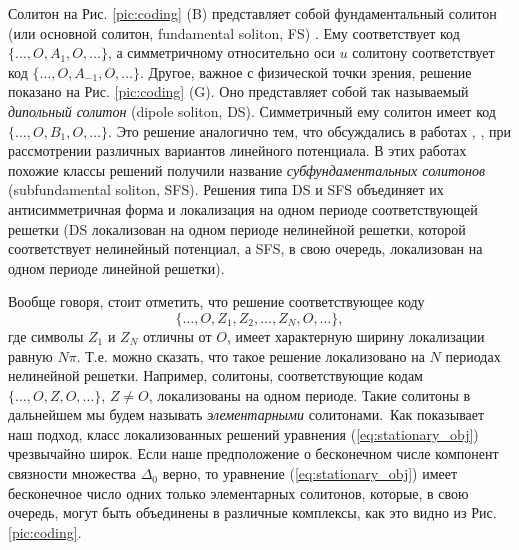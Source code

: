 Солитон на Рис. \ref{pic:coding} (B) представляет собой фундаментальный солитон (или основной солитон, fundamental soliton, FS) \citep{Malomed}.
Ему соответствует код $\{ \dots, O, A_1, O, \dots \}$, а симметричному относительно оси $u$ солитону соответствует код $\{ \dots, O, A_{-1}, O, \dots \}$.
Другое, важное с физической точки зрения, решение показано на Рис. \ref{pic:coding} (G).
Оно представляет собой так называемый {\it дипольный солитон} (dipole soliton, DS).
Симметричный ему солитон имеет код $\{ \dots, O, B_1, O, \dots \}$.
Это решение аналогично тем, что обсуждались в работах \cite{SFS1}, \cite{SFS2}, \cite{SFS3} при рассмотрении различных вариантов линейного потенциала.
В этих работах похожие классы решений получили название {\it субфундаментальных солитонов} (subfundamental soliton, SFS).
Решения типа DS и SFS объединяет их антисимметричная форма и локализация на одном периоде соответствующей решетки (DS локализован на одном периоде нелинейной решетки, которой соответствует нелинейный потенциал, а SFS, в свою очередь, локализован на одном периоде линейной решетки).

Вообще говоря, стоит отметить, что решение соответствующее коду
%
\begin{equation*}
\{ \dots, O, Z_1, Z_2, \dots, Z_N, O, \dots \},
\end{equation*}
%
где символы $Z_1$ и $Z_N$ отличны от $O$, имеет характерную ширину локализации равную $N\pi$.
Т.е. можно сказать, что такое решение локализовано на $N$ периодах нелинейной решетки.
Например, солитоны, соответствующие кодам $\{ \dots, O, Z, O, \dots \}$, $Z \neq O$, локализованы на одном периоде.
Такие солитоны в дальнейшем мы будем называть {\it элементарными} солитонами.\
Как показывает наш подход, класс локализованных решений уравнения (\ref{eq:stationary_obj}) чрезвычайно широк.
Если наше предположение о бесконечном числе компонент связности множества $\Delta_0$ верно, то уравнение (\ref{eq:stationary_obj}) имеет бесконечное число одних только элементарных солитонов, которые, в свою очередь, могут быть объединены в различные комплексы, как это видно из Рис. \ref{pic:coding}.